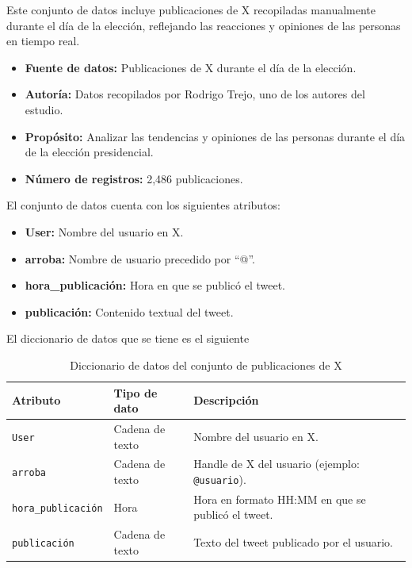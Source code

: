 \documentclass[10pt, a4paper]{article}
\begin{document}
	Este conjunto de datos incluye publicaciones de X recopiladas manualmente durante el día de la elección, reflejando las reacciones y opiniones de las personas en tiempo real.
	
	\begin{itemize}
		\item \textbf{Fuente de datos:} Publicaciones de X durante el día de la elección.
		\item \textbf{Autoría:} Datos recopilados por Rodrigo Trejo, uno de los autores del estudio.
		\item \textbf{Propósito:} Analizar las tendencias y opiniones de las personas durante el día de la elección presidencial.
		\item \textbf{Número de registros:} 2,486 publicaciones.
	\end{itemize}
	
	El conjunto de datos cuenta con los siguientes atributos:
	
	\begin{itemize}
		\item \textbf{User:} Nombre del usuario en X.
		\item \textbf{arroba:} Nombre de usuario precedido por ``@''.
		\item \textbf{hora\_publicación:} Hora en que se publicó el tweet.
		\item \textbf{publicación:} Contenido textual del tweet.
	\end{itemize}
	
	El diccionario de datos que se tiene es el siguiente
	
	\begin{table}[h]
		\centering
		\begin{tabular}{llp{9cm}}
			\hline
			\textbf{Atributo} & \textbf{Tipo de dato} & \textbf{Descripción} \\
			\hline
			\texttt{User} & Cadena de texto & Nombre del usuario en X. \\
			\texttt{arroba} & Cadena de texto & Handle de X del usuario (ejemplo: \texttt{@usuario}). \\
			\texttt{hora\_publicación} & Hora & Hora en formato HH:MM en que se publicó el tweet. \\
			\texttt{publicación} & Cadena de texto & Texto del tweet publicado por el usuario. \\
			\hline
		\end{tabular}
		\caption{Diccionario de datos del conjunto de publicaciones de X}
	\end{table}  
	
\end{document}
